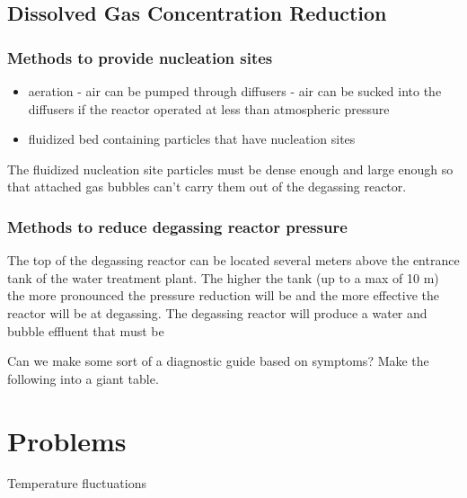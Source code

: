 \documentclass[letterpaper,10pt,english]{sphinxmanual}
\begin{document}
{\begin{itemize}
\end{itemize}


\section{Dissolved Gas Concentration Reduction}
\label{\detokenize{Dissolved_Gas/DG_Intro:dissolved-gas-concentration-reduction}}\label{\detokenize{Dissolved_Gas/DG_Intro:heading-dissolved-gas-concentration-reduction}}

\subsection{Methods to provide nucleation sites}
\label{\detokenize{Dissolved_Gas/DG_Intro:methods-to-provide-nucleation-sites}}\begin{itemize}
\item {} 
aeration
- air can be pumped through diffusers
- air can be sucked into the diffusers if the reactor operated at less than atmospheric pressure

\item {} 
fluidized bed containing particles that have nucleation sites

\end{itemize}

The fluidized nucleation site particles must be dense enough and large enough so that attached gas bubbles can’t carry them out of the degassing reactor.


\subsection{Methods to reduce degassing reactor pressure}
\label{\detokenize{Dissolved_Gas/DG_Intro:methods-to-reduce-degassing-reactor-pressure}}
The top of the degassing reactor can be located several meters above the entrance tank of the water treatment plant. The higher the tank (up to a max of 10 m) the more pronounced the pressure reduction will be and the more effective the reactor will be at degassing. The degassing reactor will produce a water and bubble effluent that must be

Can we make some sort of a diagnostic guide based on symptoms? Make the following into a giant table.


\chapter{Problems}
\label{\detokenize{Troubleshooting/Troubleshooting:problems}}\label{\detokenize{Troubleshooting/Troubleshooting::doc}}
Temperature fluctuations

}
\end{document}
